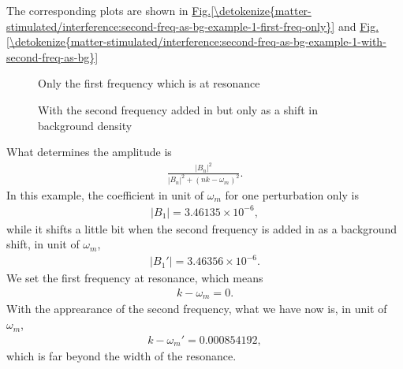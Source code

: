 \documentclass[letterpaper,12pt,english]{sphinxmanual}
\begin{document}
The corresponding plots are shown in \hyperref[\detokenize{matter-stimulated/interference:second-freq-as-bg-example-1-first-freq-only}]{Fig.\@ \ref{\detokenize{matter-stimulated/interference:second-freq-as-bg-example-1-first-freq-only}}} and \hyperref[\detokenize{matter-stimulated/interference:second-freq-as-bg-example-1-with-second-freq-as-bg}]{Fig.\@ \ref{\detokenize{matter-stimulated/interference:second-freq-as-bg-example-1-with-second-freq-as-bg}}}
\begin{figure}[htbp]
\centering
\capstart

\noindent{}
\caption{Only the first frequency which is at resonance}\label{\detokenize{matter-stimulated/interference:second-freq-as-bg-example-1-first-freq-only}}\label{\detokenize{matter-stimulated/interference:id2}}\end{figure}
\begin{figure}[htbp]
\centering
\capstart

\noindent{}
\caption{With the second frequency added in but only as a shift in background density}\label{\detokenize{matter-stimulated/interference:second-freq-as-bg-example-1-with-second-freq-as-bg}}\label{\detokenize{matter-stimulated/interference:id3}}\end{figure}

What determines the amplitude is
\begin{equation*}
\begin{split}\frac{ \left\lvert  B_{n}  \right\rvert^2 }{ \left\lvert    B_{n}  \right\rvert^2 + ( n  k - \omega_m )^2  }.\end{split}
\end{equation*}
In this example, the coefficient in unit of \(\omega_m\) for one perturbation only is
\begin{equation*}
\begin{split}\lvert B_1 \rvert = 3.46135\times 10^{-6},\end{split}
\end{equation*}
while it shifts a little bit when the second frequency is added in as a background shift, in unit of \(\omega_m\),
\begin{equation*}
\begin{split}\lvert B_1' \rvert = 3.46356\times 10^{-6}.\end{split}
\end{equation*}
We set the first frequency at resonance, which means
\begin{equation*}
\begin{split}k - \omega_m = 0.\end{split}
\end{equation*}
With the apprearance of the second frequency, what we have now is, in unit of \(\omega_m\),
\begin{equation*}
\begin{split}k - \omega_m' = 0.000854192,\end{split}
\end{equation*}
which is far beyond the width of the resonance.
\end{document}
